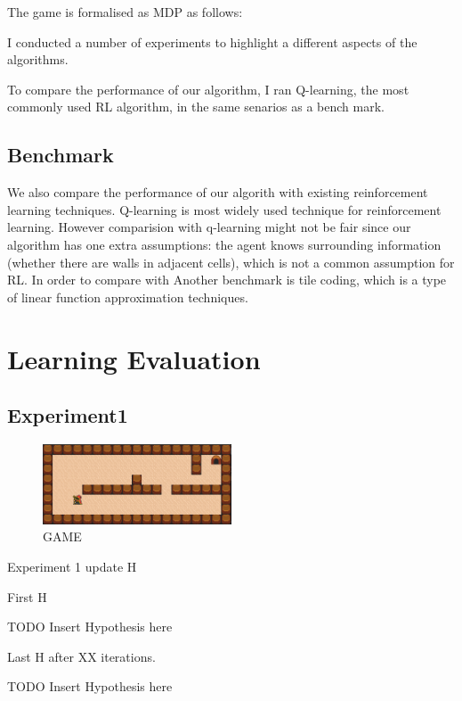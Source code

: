 The game is formalised as MDP as follows:

I conducted a number of experiments to highlight a different aspects of the algorithms. 

To compare the performance of our algorithm, I ran Q-learning, the most commonly used RL algorithm, in the same senarios as a bench mark. 

\subsection{Benchmark}

We also compare the performance of our algorith with existing reinforcement learning techniques. 
Q-learning is most widely used technique for reinforcement learning. However comparision with q-learning might not be fair 
since our algorithm has one extra assumptions: the agent knows surrounding information (whether there are walls in adjacent cells), 
which is not a common assumption for RL.
In order to compare with 
Another benchmark is tile coding, which is a type of linear function approximation techniques. 

\section{Learning Evaluation}
\label{learning_evaluation}


\subsection{Experiment1}

\begin{figure}[!htb]
\centering
\includegraphics[width=0.5\textwidth]{./figures/experiment1}
\caption{GAME }
\label{experiment1}
\end{figure}

Experiment 1 update H

First H

TODO Insert Hypothesis here

Last H after XX iterations. 

TODO Insert Hypothesis here


